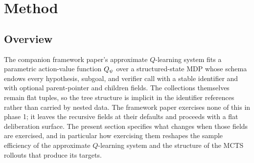 \section{Method}
\label{sec:method}


\subsection{Overview}
\label{sec:method-overview}

The companion framework paper's approximate $Q$-learning system fits a
parametric action-value function $Q_{\psi}$ over a structured-state MDP
whose schema endows every hypothesis, subgoal, and verifier call with a
stable identifier and with optional parent-pointer and children fields.
The collections themselves remain flat tuples, so the tree structure is
implicit in the identifier references rather than carried by nested
data. The framework paper exercises none of this in phase 1; it leaves
the recursive fields at their defaults and proceeds with a flat
deliberation surface. The present section specifies what changes when
those fields are exercised, and in particular how exercising them
reshapes the sample efficiency of the approximate $Q$-learning system
and the structure of the MCTS rollouts that produce its targets.

